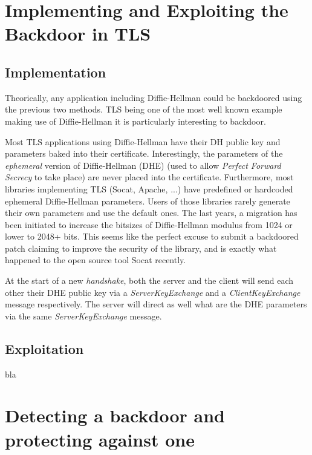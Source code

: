 \documentclass[a4paper,11pt,twocolumn]{article}
\begin{document}


\section{Implementing and Exploiting the Backdoor in TLS}

\subsection{Implementation}

Theorically, any application including Diffie-Hellman could be backdoored using the previous two methods. TLS being one of the most well known example making use of Diffie-Hellman it is particularly interesting to backdoor.

Most TLS applications using Diffie-Hellman have their DH public key and parameters baked into their certificate. Interestingly, the parameters of the \emph{ephemeral} version of Diffie-Hellman (DHE) (used to allow \emph{Perfect Forward Secrecy} to take place) are never placed into the certificate. Furthermore, most libraries implementing TLS (Socat, Apache, ...) have predefined or hardcoded ephemeral Diffie-Hellman parameters. Users of those libraries rarely generate their own parameters and use the default ones. The last years, a migration has been initiated to increase the bitsizes of Diffie-Hellman modulus from 1024 or lower to 2048+ bits. This seems like the perfect excuse to submit a backdoored patch claiming to improve the security of the library, and is exactly what happened to the open source tool Socat recently.

At the start of a new \emph{handshake}, both the server and the client will send each other their DHE public key via a \emph{ServerKeyExchange} and a \emph{ClientKeyExchange} message respectively. The server will direct as well what are the DHE parameters via the same \emph{ServerKeyExchange} message.

\subsection{Exploitation}

bla


\section{Detecting a backdoor and protecting against one}
\end{document}
